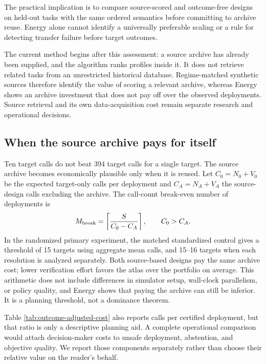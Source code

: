 The practical implication is to compare source-scored and outcome-free
designs on held-out tasks with the same ordered semantics before committing
to archive reuse.  Energy alone cannot identify a universally preferable
scaling or a rule for detecting transfer failure before target outcomes.

The current method begins after this assessment: a source archive has already
been supplied, and the algorithm ranks profiles inside it.  It does not
retrieve related tasks from an unrestricted historical database.  Regime-matched
synthetic sources therefore identify the value of scoring a relevant archive,
whereas Energy shows an archive investment that does not pay off over the
observed deployments.  Source retrieval and its
own data-acquisition cost remain separate research and operational decisions.

\subsection{When the source archive pays for itself}

Ten target calls do not beat 394 target calls for a single target.  The source
archive becomes economically plausible only when it is reused.  Let
$C_0=N_0+V_0$ be the expected target-only calls per deployment and
$C_A=N_A+V_A$ the source-design calls excluding the archive.  The call-count
break-even number of deployments is
\begin{equation}\label{eq:break-even}
 M_{\rm break}=\left\lceil\frac{S}{C_0-C_A}\right\rceil,
 \qquad C_0>C_A.
\end{equation}
In the randomized primary experiment, the matched standardized control gives
a threshold of 15 targets using aggregate mean calls, and 15--16 targets when
each resolution is analyzed separately.  Both source-based designs pay the
same archive cost; lower verification effort favors the atlas over the
portfolio on average.  This arithmetic does not include differences in simulator setup,
wall-clock parallelism, or policy quality, and Energy shows that paying the
archive can still be inferior.  It is a planning threshold, not a dominance
theorem.

Table \ref{tab:outcome-adjusted-cost} also reports calls per certified
deployment, but that ratio is only a descriptive planning aid.  A complete
operational comparison would attach decision-maker costs to unsafe deployment,
abstention, and objective quality.  We report those components separately
rather than choose their relative value on the reader's behalf.

